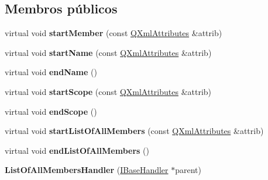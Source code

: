 \subsection*{Membros públicos}
\begin{DoxyCompactItemize}
\item 
\hypertarget{class_list_of_all_members_handler_a01468590a99c462fcde01bef28afdadf}{virtual void {\bfseries start\-Member} (const \hyperlink{class_q_xml_attributes}{Q\-Xml\-Attributes} \&attrib)}\label{class_list_of_all_members_handler_a01468590a99c462fcde01bef28afdadf}

\item 
\hypertarget{class_list_of_all_members_handler_a96036f328d26533f71146ef58e6de87f}{virtual void {\bfseries start\-Name} (const \hyperlink{class_q_xml_attributes}{Q\-Xml\-Attributes} \&attrib)}\label{class_list_of_all_members_handler_a96036f328d26533f71146ef58e6de87f}

\item 
\hypertarget{class_list_of_all_members_handler_a868f8da2b2359477e050549430602266}{virtual void {\bfseries end\-Name} ()}\label{class_list_of_all_members_handler_a868f8da2b2359477e050549430602266}

\item 
\hypertarget{class_list_of_all_members_handler_abb067eb64da1d695e2fad106bef49d7e}{virtual void {\bfseries start\-Scope} (const \hyperlink{class_q_xml_attributes}{Q\-Xml\-Attributes} \&attrib)}\label{class_list_of_all_members_handler_abb067eb64da1d695e2fad106bef49d7e}

\item 
\hypertarget{class_list_of_all_members_handler_a8a2e50703fcc9455d917fbf5eb74f5a0}{virtual void {\bfseries end\-Scope} ()}\label{class_list_of_all_members_handler_a8a2e50703fcc9455d917fbf5eb74f5a0}

\item 
\hypertarget{class_list_of_all_members_handler_a2607d3987dd3c5d47bd7ecb8d1e1adc0}{virtual void {\bfseries start\-List\-Of\-All\-Members} (const \hyperlink{class_q_xml_attributes}{Q\-Xml\-Attributes} \&attrib)}\label{class_list_of_all_members_handler_a2607d3987dd3c5d47bd7ecb8d1e1adc0}

\item 
\hypertarget{class_list_of_all_members_handler_a8ee98ede16ad434d1cf9f21e29ab9543}{virtual void {\bfseries end\-List\-Of\-All\-Members} ()}\label{class_list_of_all_members_handler_a8ee98ede16ad434d1cf9f21e29ab9543}

\item 
\hypertarget{class_list_of_all_members_handler_a15cdef68112d822da369cebc3586e6fa}{{\bfseries List\-Of\-All\-Members\-Handler} (\hyperlink{class_i_base_handler}{I\-Base\-Handler} $\ast$parent)}\label{class_list_of_all_members_handler_a15cdef68112d822da369cebc3586e6fa}


\end{DoxyCompactItemize}
